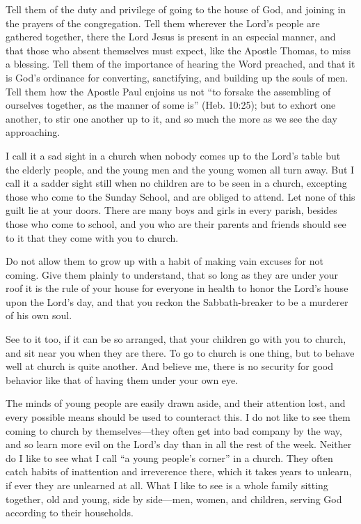 \documentclass[
]{book}
\begin{document}
Tell them of the duty and privilege of going to the house of God, and joining in the prayers of the congregation. Tell them wherever the Lord's people are gathered together, there the Lord Jesus is present in an especial manner, and that those who absent themselves must expect, like the Apostle Thomas, to miss a blessing. Tell them of the importance of hearing the Word preached, and that it is God's ordinance for converting, sanctifying, and building up the souls of men. Tell them how the Apostle Paul enjoins us not ``to forsake the assembling of ourselves together, as the manner of some is'' (Heb. 10:25); but to exhort one another, to stir one another up to it, and so much the more as we see the day approaching.

I call it a sad sight in a church when nobody comes up to the Lord's table but the elderly people, and the young men and the young women all turn away. But I call it a sadder sight still when no children are to be seen in a church, excepting those who come to the Sunday School, and are obliged to attend. Let none of this guilt lie at your doors. There are many boys and girls in every parish, besides those who come to school, and you who are their parents and friends should see to it that they come with you to church.

Do not allow them to grow up with a habit of making vain excuses for not coming. Give them plainly to understand, that so long as they are under your roof it is the rule of your house for everyone in health to honor the Lord's house upon the Lord's day, and that you reckon the Sabbath-breaker to be a murderer of his own soul.

See to it too, if it can be so arranged, that your children go with you to church, and sit near you when they are there. To go to church is one thing, but to behave well at church is quite another. And believe me, there is no security for good behavior like that of having them under your own eye.

The minds of young people are easily drawn aside, and their attention lost, and every possible means should be used to counteract this. I do not like to see them coming to church by themselves---they often get into bad company by the way, and so learn more evil on the Lord's day than in all the rest of the week. Neither do I like to see what I call ``a young people's corner'' in a church. They often catch habits of inattention and irreverence there, which it takes years to unlearn, if ever they are unlearned at all. What I like to see is a whole family sitting together, old and young, side by side---men, women, and children, serving God according to their households.
\end{document}
